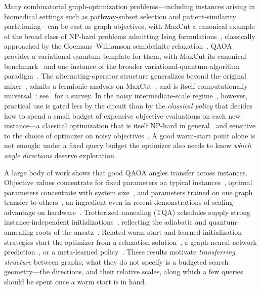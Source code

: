 \documentclass[aps,prresearch,reprint,amsmath,amssymb,floatfix,nofootinbib,superscriptaddress,longbibliography]{revtex4-2}
\theoremstyle{remark}
\newcommand{\QAOA}{\textnormal{\textsc{QAOA}}}
\newcommand{\TQA}{\textnormal{\textsc{TQA}}}
\begin{document}
Many combinatorial graph-optimization problems---including instances arising in
biomedical settings such as pathway-subset selection and patient-similarity
partitioning---can be cast as graph objectives, with MaxCut a canonical example
of the broad class of \(\mathrm{NP}\)-hard problems admitting Ising
formulations~\cite{karp1972,lucas2014}, classically approached by the
Goemans--Williamson semidefinite relaxation~\cite{goemans1995}.  \QAOA{}~\cite{farhi2014,farhi2014bounded}
provides a variational quantum template for them, with MaxCut its canonical
benchmark~\cite{crooks2018,wurtz2021,wurtz2021fixed} and one instance of the broader
variational-quantum-algorithm paradigm~\cite{cerezo2021}.
The alternating-operator structure generalizes beyond the original
mixer~\cite{hadfield2019}, admits a fermionic analysis on MaxCut~\cite{wang2018fermionic},
and is itself computationally universal~\cite{lloyd2018}; see~\cite{blekos2024}
for a survey.  In the noisy
intermediate-scale regime~\cite{preskill2018}, however, practical use is gated
less by the circuit
than by the \emph{classical policy} that decides how to spend a small budget of
expensive objective evaluations on each new instance---a classical optimization
that is itself \(\mathrm{NP}\)-hard in general~\cite{bittel2021} and sensitive to
the choice of optimizer on noisy
objectives~\cite{lavrijsen2020,pellowjarman2021,larkin2022}.  A good warm-start point
alone is not enough: under a fixed query budget the optimizer also needs to know
\emph{which angle directions} deserve exploration.

A large body of work shows that good QAOA angles transfer across instances.
Objective values concentrate for fixed parameters on typical
instances~\cite{brandao2018,zhou2020}, optimal parameters concentrate with system
size~\cite{akshay2021}, and parameters trained on one graph transfer to
others~\cite{galda2021,shaydulin2023transfer}, an ingredient even in recent
demonstrations of scaling advantage on hardware~\cite{shaydulin2024,harrigan2021,pagano2020}.
Trotterized--annealing (\TQA{})
schedules supply strong instance-independent initializations~\cite{sack2021},
reflecting the adiabatic and quantum-annealing roots of the
ansatz~\cite{farhi2001adiabatic,kadowaki1998}.  Related warm-start and
learned-initialization strategies start the optimizer from a relaxation
solution~\cite{egger2021warmstart}, a graph-neural-network
prediction~\cite{jain2022gnn}, or a meta-learned
policy~\cite{khairy2020}.
These results motivate \emph{transferring structure} between graphs; what they do
not specify is a budgeted search geometry---the directions, and their relative
scales, along which a few queries should be spent once a warm start is in hand.
\end{document}
